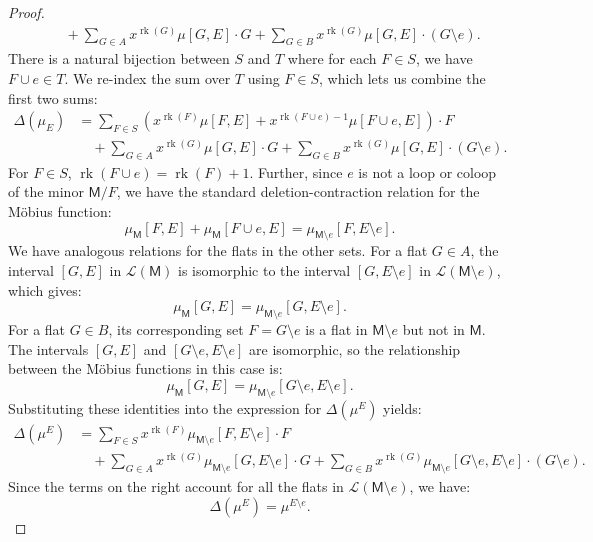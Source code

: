\documentclass[11pt, a4paper, english]{amsart}
\theoremstyle{teoremas}
\theoremstyle{definition}
\DeclareMathOperator{\rk}{rk}
\newcommand{\M}{\mathsf{M}}
\begin{document}
\begin{proof}
\begin{align*}
                      & \quad+ \sum_{G \in A} x^{\rk(G)}\mu[G,E]\cdot G + \sum_{G \in B} x^{\rk(G)}\mu[G,E]\cdot (G\setminus e).
    \end{align*}
    There is a natural bijection between $S$ and $T$ where for each $F \in S$, we have $F \cup e \in T$. We re-index the sum over $T$ using $F \in S$, which lets us combine the first two sums:
    \begin{align*}
        \Delta(\mu_E) & = \sum_{F \in S} \left( x^{\rk(F)}\mu[F,E] + x^{\rk(F\cup e)-1}\mu[F\cup e,E] \right) \cdot F            \\
                      & \quad+ \sum_{G \in A} x^{\rk(G)}\mu[G,E]\cdot G + \sum_{G \in B} x^{\rk(G)}\mu[G,E]\cdot (G\setminus e).
    \end{align*}
    For $F\in S$, $\rk(F\cup e) = \rk(F) + 1$. Further, since $e$ is not a loop or coloop of the minor $\M/F$, we have the standard deletion-contraction relation for the Möbius function:
    \[
        \mu_{\M}[F,E] + \mu_{\M}[F\cup e,E] = \mu_{\M\setminus e}[F,E\setminus e].
    \]
    We have analogous relations for the flats in the other sets. For a flat $G \in A$, the interval $[G,E]$ in $\mathcal{L}(\M)$ is isomorphic to the interval $[G, E\setminus e]$ in $\mathcal{L}(\M\setminus e)$, which gives:
    \[
        \mu_{\M}[G,E] = \mu_{\M\setminus e}[G,E\setminus e].
    \]
    For a flat $G \in B$, its corresponding set $F = G\setminus e$ is a flat in $\M\setminus e$ but not in $\M$.
    The intervals $[G, E]$ and $[G\setminus e, E\setminus e]$ are isomorphic, so the relationship between the Möbius functions in this case is:
    \[
        \mu_{\M}[G,E] = \mu_{\M\setminus e}[G\setminus e,E\setminus e].
    \]
    Substituting these identities into the expression for $\Delta(\mu^E)$ yields:
    \begin{align*}
        \Delta(\mu^E) & = \sum_{F \in S} x^{\rk(F)}\mu_{\M\setminus e}[F,E\setminus e]\cdot F                                                                                                     \\
                      & \quad+ \sum_{G \in A} x^{\rk(G)}\mu_{\M\setminus e}[G,E\setminus e]\cdot G + \sum_{G \in B} x^{\rk(G)}\mu_{\M\setminus e}[G\setminus e,E\setminus e]\cdot (G\setminus e).
    \end{align*}
    Since the terms on the right account for all the flats in $\mathcal{L}(\M\setminus e)$, we have:
    \[
        \Delta(\mu^E) = \mu^{E\setminus e}.
    \]
\end{proof}
\end{document}
